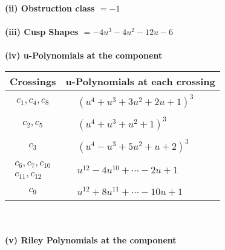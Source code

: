 \documentclass[1p]{elsarticle_modified}
\theoremstyle{definition}
\begin{document}
\flushleft \textbf{(ii) Obstruction class $= -1$}\\~\\
\flushleft \textbf{(iii) Cusp Shapes $= -4 u^3-4 u^2-12 u-6$}\\~\\
\newpage\renewcommand{\arraystretch}{1}
\flushleft \textbf{(iv) u-Polynomials at the component}\newline \\
\begin{tabular}{m{50pt}|m{274pt}}
Crossings & \hspace{64pt}u-Polynomials at each crossing \\
\hline $$\begin{aligned}c_{1},c_{4},c_{8}\end{aligned}$$&$\begin{aligned}
&(u^4+u^3+3 u^2+2 u+1)^3
\end{aligned}$\\
\hline $$\begin{aligned}c_{2},c_{5}\end{aligned}$$&$\begin{aligned}
&(u^4+u^3+u^2+1)^3
\end{aligned}$\\
\hline $$\begin{aligned}c_{3}\end{aligned}$$&$\begin{aligned}
&(u^4- u^3+5 u^2+u+2)^3
\end{aligned}$\\
\hline $$\begin{aligned}c_{6},c_{7},c_{10}\\c_{11},c_{12}\end{aligned}$$&$\begin{aligned}
&u^{12}-4 u^{10}+\cdots-2 u+1
\end{aligned}$\\
\hline $$\begin{aligned}c_{9}\end{aligned}$$&$\begin{aligned}
&u^{12}+8 u^{11}+\cdots-10 u+1
\end{aligned}$\\
\hline
\end{tabular}\\~\\
\newpage\renewcommand{\arraystretch}{1}
\flushleft \textbf{(v) Riley Polynomials at the component}\newline \\
\end{document}
